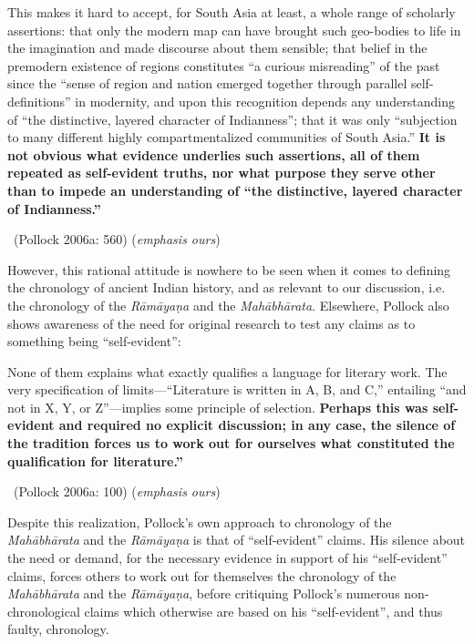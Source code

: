 \begin{myquote}
This makes it hard to accept, for South Asia at least, a whole range of scholarly assertions: that only the modern map can have brought such geo-bodies to life in the imagination and made discourse about them sensible; that belief in the premodern existence of regions constitutes “a curious misreading” of the past since the “sense of region and nation emerged together through parallel self-deﬁnitions” in modernity, and upon this recognition depends any understanding of “the distinctive, layered character of Indianness”; that it was only “subjection to many different highly compartmentalized communities of South Asia.” \textbf{It is not obvious what evidence underlies such assertions, all of them repeated as self-evident truths, nor what purpose they serve other than to impede an understanding of “the distinctive, layered character of Indianness.”} 

~\hfill (Pollock 2006a: 560) (\textit{emphasis ours})
\end{myquote}

However, this rational attitude is nowhere to be seen when it comes to defining the chronology of ancient Indian history, and as relevant to our discussion, i.e. the chronology of the \textit{Rāmāyaṇa} and the \textit{Mahābhārata}. Elsewhere, Pollock also shows awareness of the need for original research to test any claims as to something being “self-evident”:

\begin{myquote}
None of them explains what exactly qualiﬁes a language for literary work. The very speciﬁcation of limits—“Literature is written in A, B, and C,” entailing “and not in X, Y, or Z”—implies some principle of selection. \textbf{Perhaps this was self-evident and required no explicit discussion; in any case, the silence of the tradition forces us to work out for ourselves what constituted the qualiﬁcation for literature.”} 

~\hfill (Pollock 2006a: 100) (\textit{emphasis ours})
\end{myquote}

Despite this realization, Pollock’s own approach to chronology of the \textit{Mahābhārata} and the \textit{Rāmāyaṇa} is that of “self-evident” claims. His silence about the need or demand, for the necessary evidence in support of his “self-evident” claims, forces others to work out for themselves the chronology of the \textit{Mahābhārata} and the \textit{Rāmāyaṇa}, before critiquing Pollock’s numerous non-chronological claims which otherwise are based on his “self-evident”, and thus faulty, chronology.

